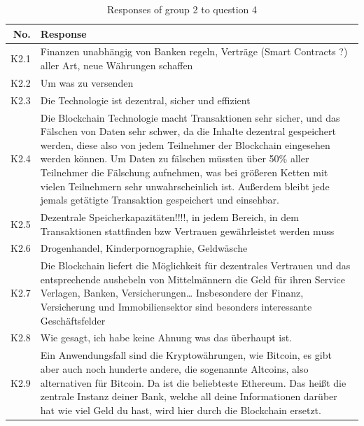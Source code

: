 \begin{table}[H]
    \centering
    \begin{tabularx}{\textwidth}{r|X}
         No. & Response \\ \hline
         K2.1 & Finanzen unabhängig von Banken regeln, Verträge (Smart Contracts ?) aller Art, neue Währungen schaffen\\
         K2.2 & Um was zu versenden \\
         K2.3 & Die Technologie ist dezentral, sicher und effizient \\
         K2.4 & Die Blockchain Technologie macht Transaktionen sehr sicher, und das Fälschen von Daten sehr schwer, da die Inhalte dezentral gespeichert werden, diese also von jedem Teilnehmer der Blockchain eingesehen werden können. Um Daten zu fälschen müssten über 50\% aller Teilnehmer die Fälschung aufnehmen, was bei größeren Ketten mit vielen Teilnehmern sehr unwahrscheinlich ist. Außerdem bleibt jede jemals getätigte Transaktion gespeichert und einsehbar.\\
         K2.5 & Dezentrale Speicherkapazitäten!!!!, in jedem Bereich, in dem Transaktionen stattfinden bzw Vertrauen gewährleistet werden muss \\
         K2.6 & Drogenhandel, Kinderpornographie, Geldwäsche \\
         K2.7 & Die Blockchain liefert die Möglichkeit für dezentrales Vertrauen und das entsprechende aushebeln von Mittelmännern die Geld für ihren Service Verlagen, Banken, Versicherungen… Insbesondere der Finanz, Versicherung und Immobiliensektor sind besonders interessante Geschäftsfelder\\
         K2.8 & Wie gesagt, ich habe keine Ahnung was das überhaupt ist. \\
         K2.9 & Ein Anwendungsfall sind die Kryptowährungen, wie Bitcoin, es gibt aber auch noch 	hunderte andere, die sogenannte Altcoins, also alternativen für Bitcoin. Da ist die beliebteste Ethereum. Das heißt die zentrale Instanz deiner Bank, welche all deine Informationen darüber hat wie viel Geld du hast, wird hier durch die Blockchain ersetzt. \\
    \end{tabularx}
    \caption{Responses of group 2 to question 4}
    \label{tab:Artefakt4}
\end{table}

